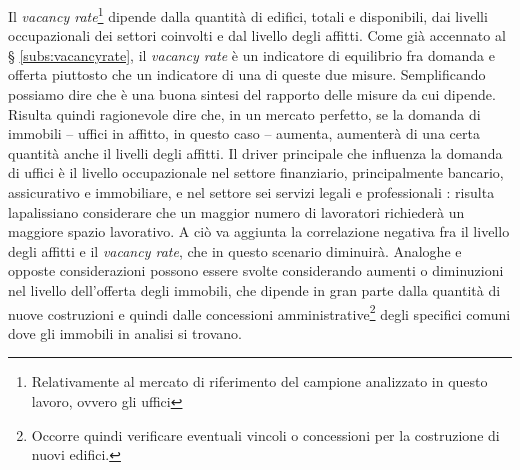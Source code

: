 Il {\itshape vacancy rate}\footnote{Relativamente al mercato di riferimento del campione analizzato in questo lavoro, ovvero gli uffici} dipende dalla quantità di edifici, totali e disponibili, dai livelli occupazionali dei settori coinvolti e dal livello degli affitti. Come già accennato al § \ref{subs:vacancyrate}, il {\itshape vacancy rate} è un indicatore di equilibrio fra domanda e offerta piuttosto che un indicatore di una di queste due misure. Semplificando possiamo dire che è una buona sintesi del rapporto delle misure da cui dipende.
Risulta quindi ragionevole dire che, in un mercato perfetto, se la domanda di immobili -- uffici in affitto, in questo caso -- aumenta, aumenterà di una certa quantità anche il livelli degli affitti.
Il driver principale che influenza la domanda di uffici è il livello occupazionale nel settore finanziario, principalmente bancario, assicurativo e immobiliare, e nel settore sei servizi legali e professionali \cite[p. 112]{geltner}: risulta lapalissiano considerare che un maggior numero di lavoratori richiederà un maggiore spazio lavorativo.
A ciò va aggiunta la correlazione negativa fra il livello degli affitti e il {\itshape vacancy rate}, che in questo scenario diminuirà.  
Analoghe e opposte considerazioni possono essere svolte considerando aumenti o diminuzioni nel livello dell'offerta degli immobili, che dipende in gran parte dalla quantità di nuove costruzioni e quindi dalle concessioni amministrative\footnote{Occorre quindi verificare eventuali vincoli o concessioni per la costruzione di nuovi edifici.} degli specifici comuni dove gli immobili in analisi si trovano.

